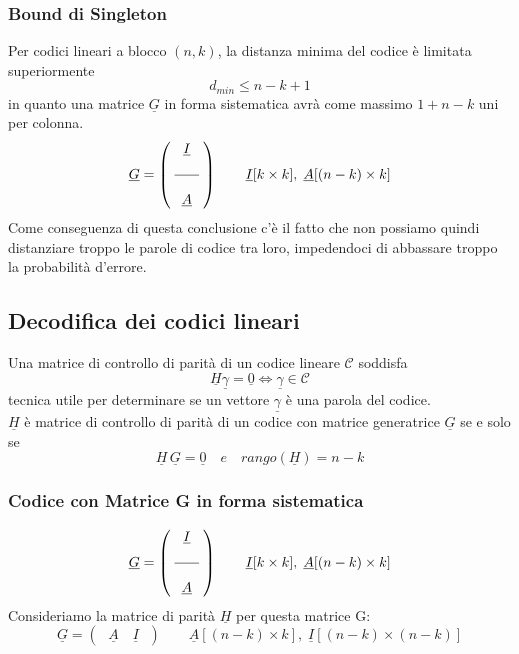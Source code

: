 \documentclass{article}
\begin{document}
\subsubsection{Bound di Singleton}
Per codici lineari a blocco $(n,k)$, la distanza minima del codice è limitata superiormente $$d_{min}\leq n-k+1$$
in quanto una matrice $\underline{G}$ in forma sistematica avrà come massimo $1+n-k$ uni per colonna.
$$\underline{G}=\left(\;\begin{array}{c}\underline{I}\\\\\hline\\\underline{A}\end{array}\;\right)\qquad\underline{I}[k\times k],\;\underline{A}[(n-k)\times k]$$
Come conseguenza di questa conclusione c'è il fatto che non possiamo quindi distanziare troppo le parole di codice tra loro, impedendoci di abbassare troppo la probabilità d'errore.\\

\subsection{Decodifica dei codici lineari}
Una matrice di controllo di parità di un codice lineare $\mathcal{C}$ soddisfa
$$\underline{H}\underline{\gamma}=\underline{0}\iff\underline{\gamma}\in\mathcal{C}$$ tecnica utile per determinare se un vettore $\underline{\gamma}$ è una parola del codice.\\
$\underline{H}$ è matrice di controllo di parità di un codice con matrice generatrice $\underline{G}$ se e solo se 
$$\underline{H}\,\underline{G}=\underline{0}\quad e \quad rango(\underline{H})=n-k$$

\subsubsection{Codice con Matrice G in forma sistematica}
$$\underline{G}=\left(\;\begin{array}{c}\underline{I}\\\\\hline\\\underline{A}\end{array}\;\right)\qquad\underline{I}[k\times k],\;\underline{A}[(n-k)\times k]$$
Consideriamo la matrice di parità $\underline{H}$ per questa matrice G:
$$
\underline{G}=\left(\;
\begin{array}{cc}
	\underline{A}\quad\underline{I}
\end{array}\;\right)
\qquad
\underline{A}[(n-k)\times k],\;\underline{I}[(n-k)\times (n-k)]$$
\end{document}
